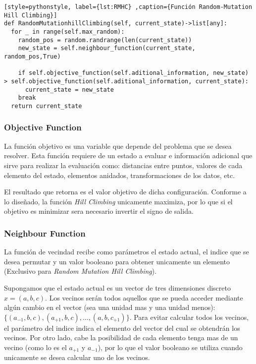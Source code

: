 \documentclass[12pt,twoside]{article}
\begin{document}
\begin{lstlisting}[style=pythonstyle, label={lst:RMHC} ,caption={Función Random-Mutation Hill Climbing}]
def RandomMutationhillClimbing(self, current_state)->list[any]:       
  for _ in range(self.max_random):
    random_pos = random.randrange(len(current_state))
    new_state = self.neighbour_function(current_state, random_pos,True)
  
    if self.objective_function(self.aditional_information, new_state) > self.objective_function(self.aditional_information, current_state):
      current_state = new_state
    break
  return current_state
\end{lstlisting}

\subsubsection{Objective Function}

La función objetivo es una variable que depende del problema que se desea resolver. Esta función requiere de un estado a evaluar e información adicional que sirve para realizar la evaluación como: distancias entre puntos, valores de cada elemento del estado, elementos anidados, transformaciones de los datos, etc.

El resultado que retorna es el valor objetivo de dicha configuración. Conforme a lo diseñado, la función \textit{Hill Climbing} unicamente maximiza, por lo que si el objetivo es minimizar sera necesario invertir el signo de salida. 

\subsubsection{Neighbour Function}

La función de vecindad recibe como parámetros el estado actual, el indice que se desea permutar y un valor booleano para obtener unicamente un elemento (Exclusivo para \textit{Random Mutation Hill Climbing}).

Supongamos que el estado actual es un vector de tres dimensiones discreto $x = (a,b,c)$. Los vecinos serán todos aquellos que se pueda acceder mediante algún cambio en el vector (sea una unidad mas y una unidad menos): $\{ (a_{-1},b,c), (a_{+1},b,c), \dots , (a,b,c_{+1}) \}$. Para evitar calcular todos los vecinos, el parámetro del indice indica el elemento del vector del cual se obtendrán los vecinos. Por otro lado, cabe la posibilidad de cada elemento tenga mas de un vecino (como lo es el $a_{+1}$ y $a_{-1}$), por lo que el valor booleano se utiliza cuando unicamente se desea calcular uno de los vecinos.
\end{document}
